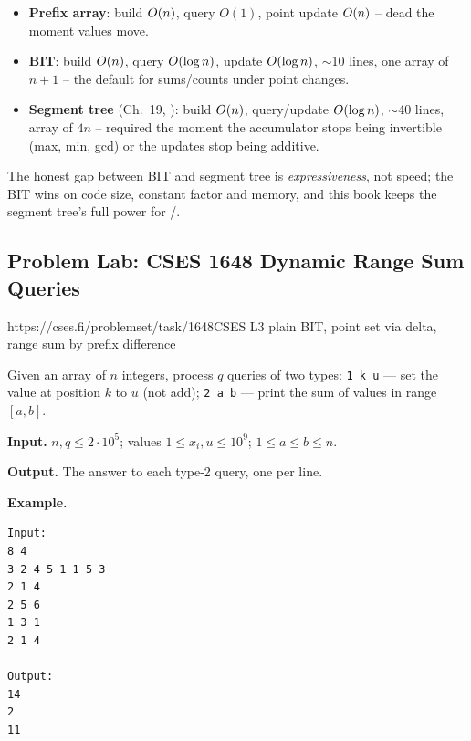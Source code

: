\begin{comparisonbox}
\begin{itemize}[nosep,leftmargin=1.4em]
  \item \textbf{Prefix array}: build \(O(n)\), query \(O(1)\), point
        update \(O(n)\) -- dead the moment values move.
  \item \textbf{BIT}: build \(O(n)\), query \(O(\log n)\), update
        \(O(\log n)\), \(\sim\)10 lines, one array of \(n{+}1\) -- the
        default for sums/counts under point changes.
  \item \textbf{Segment tree} (Ch.~19, ): build \(O(n)\),
        query/update \(O(\log n)\), \(\sim\)40 lines, array of
        \(4n\) -- required the moment the accumulator stops being
        invertible (max, min, gcd) or the updates stop being additive.
\end{itemize}
The honest gap between BIT and segment tree is \emph{expressiveness}, not
speed; the BIT wins on code size, constant factor and memory, and this book
keeps the segment tree's full power for /.
\end{comparisonbox}

\subsection{Problem Lab: CSES 1648 Dynamic Range Sum Queries}

  {https://cses.fi/problemset/task/1648}{CSES L3}
  {plain BIT, point set via delta, range sum by prefix difference}

\begin{problemstatement}
Given an array of \(n\) integers, process \(q\) queries of two types:
\texttt{1 k u} --- set the value at position \(k\) to \(u\) (not add);
\texttt{2 a b} --- print the sum of values in range \([a,b]\).

\textbf{Input.} \(n,q\le 2\cdot10^5\); values \(1\le x_i,u\le10^9\);
\(1\le a\le b\le n\).

\textbf{Output.} The answer to each type-2 query, one per line.

\textbf{Example.}
\begin{verbatim}
Input:
8 4
3 2 4 5 1 1 5 3
2 1 4
2 5 6
1 3 1
2 1 4

Output:
14
2
11
\end{verbatim}
\end{problemstatement}

